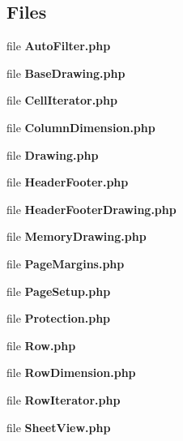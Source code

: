 \subsection*{Files}
\begin{DoxyCompactItemize}
\item 
file {\bfseries Auto\+Filter.\+php}
\item 
file {\bfseries Base\+Drawing.\+php}
\item 
file {\bfseries Cell\+Iterator.\+php}
\item 
file {\bfseries Column\+Dimension.\+php}
\item 
file {\bfseries Drawing.\+php}
\item 
file {\bfseries Header\+Footer.\+php}
\item 
file {\bfseries Header\+Footer\+Drawing.\+php}
\item 
file {\bfseries Memory\+Drawing.\+php}
\item 
file {\bfseries Page\+Margins.\+php}
\item 
file {\bfseries Page\+Setup.\+php}
\item 
file {\bfseries Protection.\+php}
\item 
file {\bfseries Row.\+php}
\item 
file {\bfseries Row\+Dimension.\+php}
\item 
file {\bfseries Row\+Iterator.\+php}
\item 
file {\bfseries Sheet\+View.\+php}
\end{DoxyCompactItemize}
